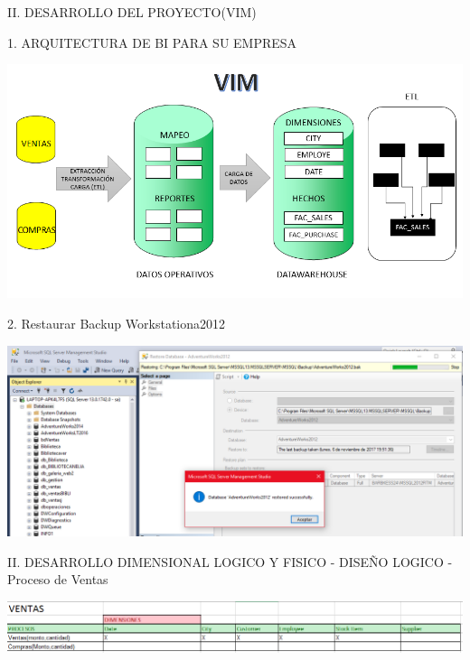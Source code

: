 \documentclass[12pt,letterpaper]{article}
\begin{document}
II.	DESARROLLO DEL PROYECTO(VIM)

1.	ARQUITECTURA DE BI PARA SU EMPRESA

\begin{center}
\includegraphics[width=17cm]{IMG/empresa.png} 
\end{center}

2. Restaurar Backup Workstationa2012

\begin{center}
\includegraphics[width=17cm]{IMG/backup.png} 
\end{center}

II.	DESARROLLO DIMENSIONAL LOGICO Y FISICO
- DISE\~NO LOGICO
- Proceso de Ventas

\begin{center}
\includegraphics[width=17cm]{IMG/3.png} 
\end{center}
 \newpage
\end{document}

